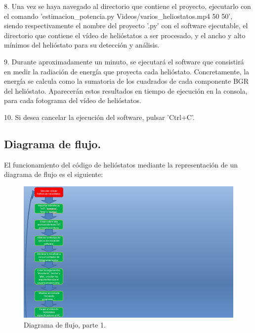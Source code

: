 8. Una vez se haya navegado al directorio que contiene el proyecto, ejecutarlo con el comando 'estimacion\_potencia.py Videos/varios\_heliostatos.mp4 50 50', siendo respectivamente el nombre del proyecto '.py' con el software ejecutable, el directorio que contiene el vídeo de helióstatos a ser procesado, y el ancho y alto mínimos del helióstato para su detección y análisis.

9. Durante aproximadamente un minuto, se ejecutará el software que consistirá en medir la radiación de energía que proyecta cada helióstato. Concretamente, la energía se calcula como la sumatoria de los cuadrados de cada componente BGR del helióstato. Aparecerán estos resultados en tiempo de ejecución en la consola, para cada fotograma del vídeo de helióstatos.

10. Si desea cancelar la ejecución del software, pulsar 'Ctrl+C'.

\subsection{Diagrama de flujo.}

El funcionamiento del código de helióstatos mediante la representación de un diagrama de flujo es el siguiente:

\begin{figure}[h!]
  	\centering
	\includegraphics[width=\textwidth]{DiagramaFlujoSoftwareTFG/diagramaFlujo1.PNG}
	\caption{Diagrama de flujo, parte 1.
	\label{fig:DiagramaFlujoSoftwareTFG/diagramaFlujo1.PNG}}
\end{figure}

